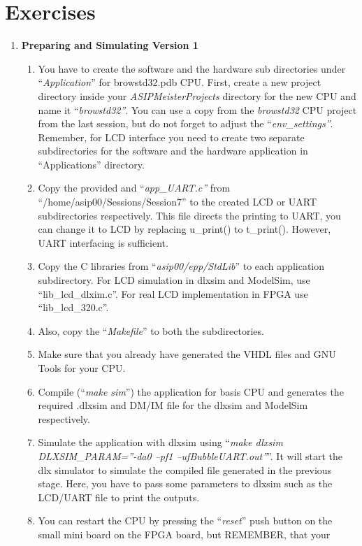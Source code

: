 \section*{Exercises}
\begin{enumerate}
\item \textbf{Preparing and Simulating Version 1}
	\begin{enumerate}
		\item
		You have to create the software and the hardware sub directories
		under ``\emph{Application}'' for browstd32.pdb CPU. First, create a
		new project directory inside your \emph{ASIPMeisterProjects}
		directory for the new CPU and name it ``\emph{browstd32''}. You can
		use a copy from the \emph{browstd32} CPU project from the last
		session, but do not forget to adjust the ``\emph{env\_settings''}.
		Remember, for LCD interface you need to create two separate
		subdirectories for the software and the hardware application in
		``Applications'' directory.
		\item
		Copy the provided and ``\emph{app\_UART.c''} from
		``/home/asip00/Sessions/Session7'' to the created LCD or UART
		subdirectories respectively. This file directs the printing to UART,
		you can change it to LCD by replacing u\_print() to t\_print().
		However, UART interfacing is sufficient.
		\item
		Copy the C libraries from ``\emph{asip00/epp/StdLib}'' to each
		application subdirectory. For LCD simulation in dlxsim and ModelSim,
		use ``lib\_lcd\_dlxim.c''. For real LCD implementation in FPGA use
		``lib\_lcd\_320.c''.
		\item
		Also, copy the ``\emph{Makefile}'' to both the subdirectories.
		\item
		Make sure that you already have generated the VHDL files and GNU
		Tools for your CPU.
		\item
		Compile (``\emph{make sim}'') the application for basis CPU and
		generates the required .dlxsim and DM/IM file for the dlxsim and
		ModelSim respectively.
		\item
		Simulate the application with dlxsim using ``\emph{make dlxsim
			DLXSIM\_PARAM=''-da0 --pf1 --ufBubbleUART.out''}''. It will start
		the dlx simulator to simulate the compiled file generated in the
		previous stage. Here, you have to pass some parameters to dlxsim
		such as the LCD/UART file to print the outputs.
		\item
		You can restart the CPU by pressing the ``\emph{reset}'' push button
		on the small mini board on the FPGA board, but REMEMBER, that your

\end{enumerate}
\end{enumerate}

